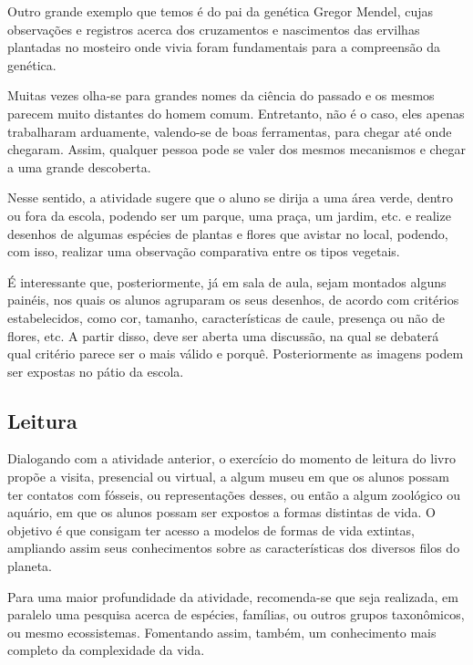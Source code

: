 \documentclass[12pt]{extarticle}
\begin{document}


Outro grande exemplo que temos é do pai da genética Gregor Mendel, cujas
observações e registros acerca dos cruzamentos e nascimentos das ervilhas
plantadas no mosteiro onde vivia foram fundamentais para a compreensão da
genética.

Muitas vezes olha-se para grandes nomes da ciência do passado e os mesmos
parecem muito distantes do homem comum. Entretanto, não é o caso, eles apenas
trabalharam arduamente, valendo-se de boas ferramentas, para chegar até onde
chegaram. Assim, qualquer pessoa pode se valer dos mesmos mecanismos e chegar
a uma grande descoberta.

Nesse sentido, a atividade sugere que o aluno se dirija a uma área verde,
dentro ou fora da escola, podendo ser um parque, uma praça, um jardim, etc.
e realize desenhos de algumas espécies de plantas e flores que avistar no
local, podendo, com isso, realizar uma observação comparativa entre os tipos
vegetais.

É interessante que, posteriormente, já em sala de aula, sejam montados alguns
painéis, nos quais os alunos agruparam os seus desenhos, de acordo com
critérios estabelecidos, como cor, tamanho, características de caule, presença
ou não de flores, etc. A partir disso, deve ser aberta uma discussão, na qual
se debaterá qual critério parece ser o mais válido e porquê. Posteriormente as
imagens podem ser expostas no pátio da escola.

\subsection{Leitura}

Dialogando com a atividade anterior, o exercício do momento de leitura do livro
propõe a visita, presencial ou virtual, a algum museu em que os alunos possam
ter contatos com fósseis, ou representações desses, ou então a algum zoológico
ou aquário, em que os alunos possam ser expostos a formas distintas de vida.
O objetivo é que consigam ter acesso a modelos de formas de vida extintas,
ampliando assim seus conhecimentos sobre as características dos diversos filos
do planeta.

Para uma maior profundidade da atividade, recomenda-se que seja realizada, em
paralelo uma pesquisa acerca de espécies, famílias, ou outros grupos
taxonômicos, ou mesmo ecossistemas. Fomentando assim, também, um conhecimento
mais completo da complexidade da vida.
\end{document}
